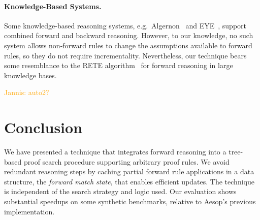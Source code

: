 \documentclass[runningheads]{llncs}
\newcommand{\jcom}[1]{{\textcolor{orange}{Jannis: #1}} }
\begin{document}
\paragraph{Knowledge-Based Systems.}
Some knowledge-based reasoning systems, e.g.\ Algernon~\cite{Algernon} and EYE~\cite{EYE}, support combined forward and backward reasoning.
However, to our knowledge, no such system allows non-forward rules to change the assumptions available to forward rules, so they do not require incrementality.
Nevertheless, our technique bears some resemblance to the RETE algorithm~\cite{RETE} for forward reasoning in large knowledge bases.

\jcom{auto2?}

\section{Conclusion}

We have presented a technique that integrates forward reasoning into a tree-based proof search procedure supporting arbitrary proof rules.
We avoid redundant reasoning steps by caching partial forward rule applications in a data structure, the \emph{forward match state}, that enables efficient updates.
The technique is independent of the search strategy and logic used.
Our evaluation shows substantial speedups on some synthetic benchmarks, relative to Aesop's previous implementation.


\end{document}
